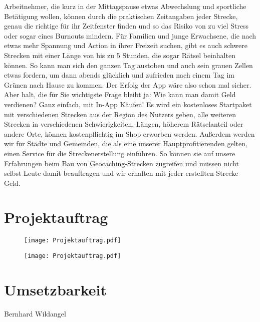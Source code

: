 \documentclass[a4paper, 12pt]{article}
\begin{document}
Arbeitnehmer, die kurz in der Mittagspause etwas Abwechslung und sportliche Betätigung wollen, können durch die praktischen Zeitangaben jeder Strecke, genau die richtige für ihr Zeitfenster finden und so das Risiko von zu viel Stress oder sogar eines Burnouts mindern.\newline
Für Familien und junge Erwachsene, die nach etwas mehr Spannung und Action in ihrer Freizeit suchen, gibt es auch schwere Strecken mit einer Länge von bis zu 5 Stunden, die sogar Rätsel beinhalten können. So kann man sich den ganzen Tag austoben und auch sein grauen Zellen etwas fordern, um dann abends glücklich und zufrieden nach einem Tag im Grünen nach Hause zu kommen.\newline
Der Erfolg der App wäre also schon mal sicher. Aber halt, die für Sie wichtigste Frage bleibt ja: Wie kann man damit Geld verdienen? Ganz einfach, mit In-App Käufen!\newline
Es wird ein kostenloses Startpaket mit verschiedenen Strecken aus der Region des Nutzers geben, alle weiteren Strecken in verschiedenen Schwierigkeiten, Längen, höherem Rätselanteil oder andere Orte, können kostenpflichtig im Shop erworben werden. Außerdem werden wir für Städte und Gemeinden, die als eine unserer Hauptprofitierenden gelten, einen Service für die Streckenerstellung einführen. So können sie auf unsere Erfahrungen beim Bau von Geocaching-Strecken zugreifen und müssen nicht selbst Leute damit beauftragen und wir erhalten mit jeder erstellten Strecke Geld.

\section{Projektauftrag}
\begin{figure}[H] 
	\begin{minipage}{17cm} 
	   \texttt{[image: Projektauftrag.pdf]} 
	\end{minipage}
\end{figure}

\begin{figure}[H] 
	\begin{minipage}{17cm} 
	   \texttt{[image: Projektauftrag.pdf]} 
	\end{minipage}
\end{figure}



\newpage
\section{Umsetzbarkeit}Bernhard Wildangel\\
\end{document}

